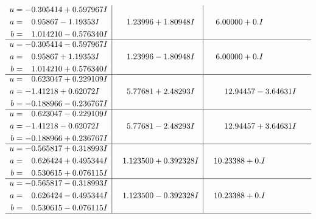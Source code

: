 \documentclass[1p]{elsarticle_modified}
\theoremstyle{definition}
\begin{document}
$$\begin{array}{c|c|c}
\begin{aligned}
u &= -0.305414 + 0.597967 I \\
a &= \phantom{-}0.95867 - 1.19353 I \\
b &= \phantom{-}1.014210 - 0.576340 I\end{aligned}
 & \phantom{-}1.23996 + 1.80948 I & \phantom{-}6.00000 + 0. I\phantom{ +0.000000I} \\ \hline\begin{aligned}
u &= -0.305414 - 0.597967 I \\
a &= \phantom{-}0.95867 + 1.19353 I \\
b &= \phantom{-}1.014210 + 0.576340 I\end{aligned}
 & \phantom{-}1.23996 - 1.80948 I & \phantom{-}6.00000 + 0. I\phantom{ +0.000000I} \\ \hline\begin{aligned}
u &= \phantom{-}0.623047 + 0.229109 I \\
a &= -1.41218 + 0.62072 I \\
b &= -0.188966 - 0.236767 I\end{aligned}
 & \phantom{-}5.77681 + 2.48293 I & \phantom{-}12.94457 - 3.64631 I \\ \hline\begin{aligned}
u &= \phantom{-}0.623047 - 0.229109 I \\
a &= -1.41218 - 0.62072 I \\
b &= -0.188966 + 0.236767 I\end{aligned}
 & \phantom{-}5.77681 - 2.48293 I & \phantom{-}12.94457 + 3.64631 I \\ \hline\begin{aligned}
u &= -0.565817 + 0.318993 I \\
a &= \phantom{-}0.626424 + 0.495344 I \\
b &= \phantom{-}0.530615 + 0.076115 I\end{aligned}
 & \phantom{-}1.123500 + 0.392328 I & \phantom{-}10.23388 + 0. I\phantom{ +0.000000I} \\ \hline\begin{aligned}
u &= -0.565817 - 0.318993 I \\
a &= \phantom{-}0.626424 - 0.495344 I \\
b &= \phantom{-}0.530615 - 0.076115 I\end{aligned}
 & \phantom{-}1.123500 - 0.392328 I & \phantom{-}10.23388 + 0. I\phantom{ +0.000000I}\\
 \hline 
 \end{array}$$\newpage$$\begin{array}{c|c|c}  

\end{array}$$
\end{document}
